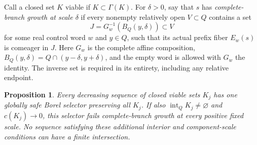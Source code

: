\documentclass[11pt,reqno]{amsart}
\numberwithin{equation}{section}
\newtheorem{proposition}[theorem]{Proposition}
\theoremstyle{definition}
\newcommand{\intr}{\operatorname{int}}
\begin{document}
Call a closed set $K$ viable if $K\subset\Gamma(K)$.
For $\delta>0$, say that $s$ has \emph{complete-branch growth at scale
$\delta$} if every nonempty relatively open $V\subset Q$ contains a
set
\[
 J=G_w^{-1}(B_Q(y,\delta))\subset V
\]
for some real control word $w$ and $y\in Q$, such that its actual
prefix fiber $E_w(s)$ is comeager in $J$. Here $G_w$ is the complete
affine composition, $B_Q(y,\delta)=Q\cap(y-\delta,y+\delta)$,
and the empty word is allowed with $G_w$ the identity. The inverse
set is required in its entirety, including any relative endpoint.

\begin{proposition}\label{prop:nested-selector}
Every decreasing sequence of closed viable sets $K_j$ has one
globally safe Borel selector preserving all $K_j$. If also
$\intr_QK_j\ne\varnothing$ and $c(K_j)\to0$, this selector
fails complete-branch growth at every positive fixed scale.
No sequence satisfying these additional interior and component-scale
conditions can have a finite intersection.
\end{proposition}
\end{document}
